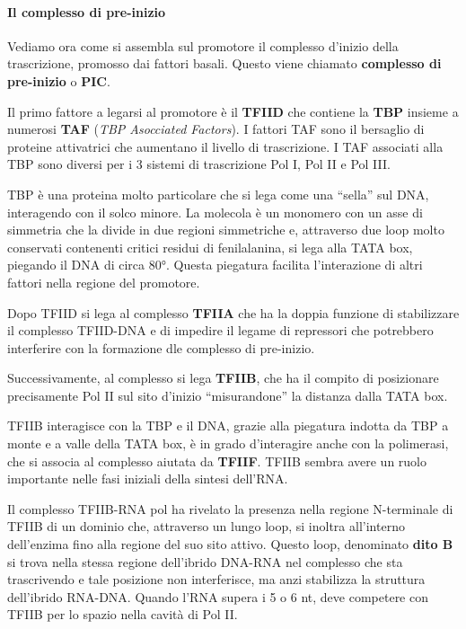 \documentclass[11pt]{book}
\begin{document}
\paragraph{Il complesso di pre-inizio}\label{il-complesso-di-pre-inizio}

Vediamo ora come si assembla sul promotore il complesso d'inizio della
trascrizione, promosso dai fattori basali. Questo viene chiamato
\textbf{complesso di pre-inizio} o \textbf{PIC}.

Il primo fattore a legarsi al promotore è il \textbf{TFIID} che contiene
la \textbf{TBP} insieme a numerosi \textbf{TAF} (\emph{TBP Asocciated
Factors}). I fattori TAF sono il bersaglio di proteine attivatrici che
aumentano il livello di trascrizione. I TAF associati alla TBP sono
diversi per i 3 sistemi di trascrizione Pol I, Pol II e Pol III.

TBP è una proteina molto particolare che si lega come una ``sella'' sul
DNA, interagendo con il solco minore. La molecola è un monomero con un
asse di simmetria che la divide in due regioni simmetriche e, attraverso
due loop molto conservati contenenti critici residui di fenilalanina, si
lega alla TATA box, piegando il DNA di circa 80°. Questa piegatura
facilita l'interazione di altri fattori nella regione del promotore.

Dopo TFIID si lega al complesso \textbf{TFIIA} che ha la doppia funzione
di stabilizzare il complesso TFIID-DNA e di impedire il legame di
repressori che potrebbero interferire con la formazione dle complesso di
pre-inizio.

Successivamente, al complesso si lega \textbf{TFIIB}, che ha il compito
di posizionare precisamente Pol II sul sito d'inizio ``misurandone'' la
distanza dalla TATA box.

TFIIB interagisce con la TBP e il DNA, grazie alla piegatura indotta da
TBP a monte e a valle della TATA box, è in grado d'interagire anche con
la polimerasi, che si associa al complesso aiutata da \textbf{TFIIF}.
TFIIB sembra avere un ruolo importante nelle fasi iniziali della sintesi
dell'RNA.

Il complesso TFIIB-RNA pol ha rivelato la presenza nella regione
N-terminale di TFIIB di un dominio che, attraverso un lungo loop, si
inoltra all'interno dell'enzima fino alla regione del suo sito attivo.
Questo loop, denominato \textbf{dito B} si trova nella stessa regione
dell'ibrido DNA-RNA nel complesso che sta trascrivendo e tale posizione
non interferisce, ma anzi stabilizza la struttura dell'ibrido RNA-DNA.
Quando l'RNA supera i 5 o 6 nt, deve competere con TFIIB per lo spazio
nella cavità di Pol II.
\end{document}

